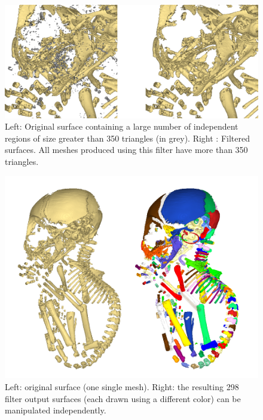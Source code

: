 \begin{figure}
  \centering
  \includegraphics[scale=0.3]{images/Edit_selected_objects/03_Decompose_34.png} 
	\caption{Left: Original surface containing a large number of independent regions of size greater than 350 triangles (in grey). Right : Filtered surfaces. All meshes produced using this filter have more than 350 triangles.}
\label{decompose34}
 
\end{figure}

\begin{figure}
  \centering
  \includegraphics[scale=0.4]{images/Edit_selected_objects/03_Decompose5.png} 
	\caption{Left: original surface (one single mesh). Right: the resulting 298 filter output surfaces (each drawn using a different color) can be manipulated independently.}
\label{decompose5}
 
\end{figure}





